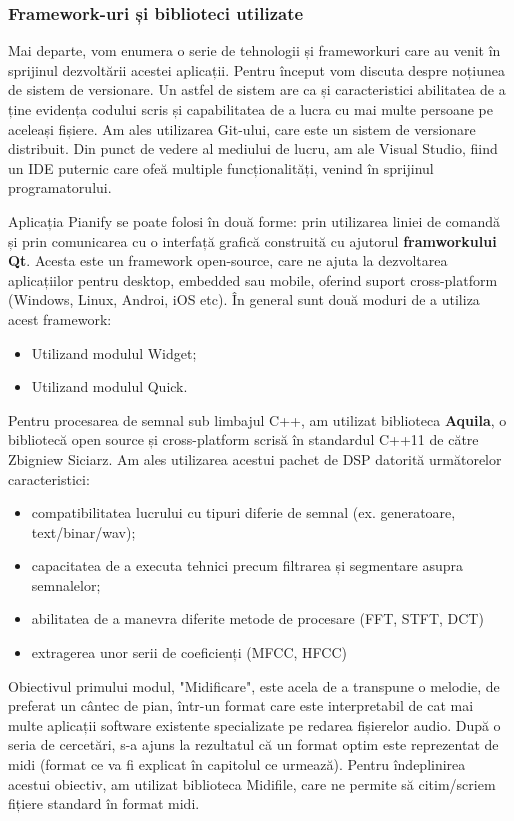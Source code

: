 \documentclass[a4paper,12pt]{report}
\begin{document}
  	\subsubsection{Framework-uri și biblioteci utilizate}
  	Mai departe, vom enumera o serie de tehnologii și frameworkuri care au venit în sprijinul dezvoltării acestei aplicații. Pentru început vom discuta despre noțiunea de sistem de versionare. Un astfel de sistem are ca și caracteristici abilitatea de a ține evidența codului scris și capabilitatea de a lucra cu mai multe persoane pe aceleași fișiere. Am ales utilizarea Git-ului, care este un sistem de versionare distribuit. Din punct de vedere al mediului de lucru, am ale Visual Studio, fiind un IDE puternic care ofeă multiple funcționalități, venind în sprijinul programatorului.
  	
  	Aplicația Pianify se poate folosi în două forme: prin utilizarea liniei de comandă și prin comunicarea cu o interfață grafică construită cu ajutorul\textbf{ framworkului Qt}. Acesta este un framework open-source, care ne ajuta la dezvoltarea aplicațiilor pentru desktop, embedded sau mobile, oferind suport cross-platform (Windows, Linux, Androi, iOS etc). În general sunt două moduri de a utiliza acest framework: 
  	 	
  	\begin{itemize}
  		\item Utilizand modulul Widget;
  		\item Utilizand modulul Quick.
  	\end{itemize}
  
  	Pentru procesarea de semnal sub limbajul C++, am utilizat biblioteca\textbf{ Aquila}, o bibliotecă open source și cross-platform scrisă în standardul C++11 de către Zbigniew Siciarz. Am ales utilizarea acestui pachet de DSP datorită următorelor caracteristici:
  	
  	\begin{itemize}
  		\item compatibilitatea lucrului cu tipuri diferie de semnal (ex. generatoare, text/binar/wav);
  		\item capacitatea de a executa tehnici precum filtrarea și segmentare asupra semnalelor;
  		\item abilitatea de a manevra diferite metode de procesare (FFT, STFT, DCT)
  		\item extragerea unor serii de coeficienți (MFCC, HFCC)
  	\end{itemize}
  
  	Obiectivul primului modul, "Midificare", este acela de a transpune o melodie, de preferat un cântec de pian, într-un format care este interpretabil de cat mai multe aplicații software existente specializate pe redarea fișierelor audio. După o seria de cercetări, s-a ajuns la rezultatul că un format optim este reprezentat de midi (format ce va fi explicat în capitolul ce urmează). Pentru îndeplinirea acestui obiectiv, am utilizat biblioteca Midifile, care ne permite să citim/scriem fițiere standard în format midi.
  
\end{document}
